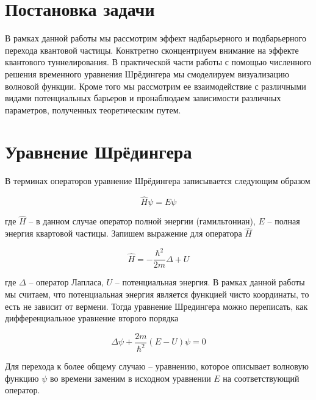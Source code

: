 \documentclass[a4paper, 12pt]{article}
\begin{document}
    

    \tableofcontents{} %
    \newpage

    \section{Постановка задачи}

    В рамках данной работы мы рассмотрим эффект надбарьерного и подбарьерного перехода квантовой частицы.
    Конктретно сконцентриуем внимание на эффекте квантового туннелирования. В практической части работы с помощью
    численного решения временного уравнения Шрёдингера мы смоделируем визуализацию волновой функции. 
    Кроме того мы рассмотрим ее взаимодействие с различными видами потенциальных барьеров и пронаблюдаем зависимости
    различных параметров, полученных теоретическим путем.

    \section{Уравнение Шрёдингера}

    В терминах операторов уравнение Шрёдингера записывается следующим образом

    \begin{equation}
        \hat{H} \psi = E \psi
    \end{equation}

    где $\hat{H}$ -- в данном случае оператор полной энергии (гамильтониан), $E$ -- полная энергия квартовой частицы. Запишем выражение для оператора $\hat{H}$

    \begin{equation}
        \hat{H} = - \frac{\hbar^2}{2m} \Delta + U
    \end{equation}

    где $\Delta$ -- оператор Лапласа, $U$ -- потенциальная энергия. В рамках данной работы мы считаем, что потенциальная энергия
    является функцией чисто координаты, то есть не зависит от вермени. Тогда уравнение Шредингера можно переписать, как
    дифференциальное уравнение второго порядка

    \begin{equation}
        \Delta \psi + \frac{2m}{\hbar^2} (E - U) \psi = 0
    \end{equation}

    Для перехода к более общему случаю -- уравнению, которое описывает волновую функцию $\psi$ во времени заменим в исходном 
    уравнении $E$ на соответствующий оператор. 
\end{document}
